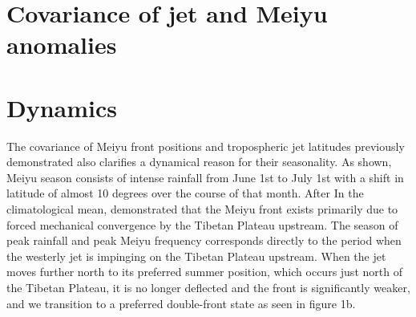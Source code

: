 \documentclass[draft,grl]{AGUTeX}
\begin{document}
\begin{article}
	
\section{Covariance of jet and Meiyu anomalies}

	
\section{Dynamics}

	The covariance of Meiyu front positions and tropospheric jet latitudes previously demonstrated also clarifies a dynamical reason for their seasonality. As shown, Meiyu season consists of intense rainfall from June 1st to July 1st with a shift in latitude of almost 10 degrees over the course of that month. After  In the climatological mean, \cite{Chen2014} demonstrated that the Meiyu front exists primarily due to forced mechanical convergence by the Tibetan Plateau upstream. The season of peak rainfall and peak Meiyu frequency corresponds directly to the period when the westerly jet is impinging on the Tibetan Plateau upstream. When the jet moves further north to its preferred summer position, which occurs just north of the Tibetan Plateau, it is no longer deflected and the front is significantly weaker, and we transition to a preferred double-front state as seen in figure 1b. 
	


\end{article}
\end{document}
